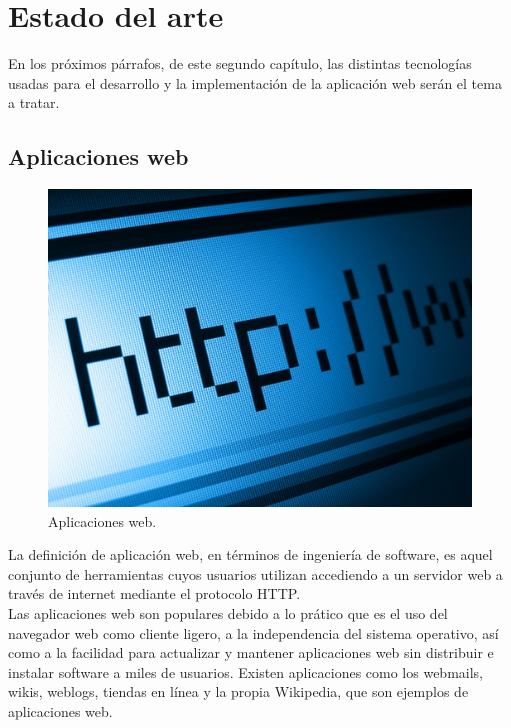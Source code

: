 \chapter{Estado del arte}\label{CAP:Estadodelarte}
En los pr\'oximos p\'arrafos, de este segundo cap\'itulo, las distintas tecnolog\'ias usadas para el desarrollo y la implementaci\'on de la aplicaci\'on web ser\'an el tema a tratar.\\
 
\section{Aplicaciones web}\label{SEC:Seccion1}

\begin{figure}[htbp]

    \centering
    	\includegraphics[scale=0.1]{./Figuras/appweb.jpg}
    \caption{Aplicaciones web.}
    \label{fig:appweb}
    
\end{figure}

La definici\'on de aplicaci\'on web, en t\'erminos de ingenier\'ia de software, es aquel conjunto de herramientas cuyos usuarios utilizan accediendo a un servidor web a trav\'es de internet mediante el protocolo HTTP.\\

Las aplicaciones web son populares debido a lo pr\'atico que es el uso del navegador web como cliente ligero, a la independencia del sistema operativo, as\'i como a la facilidad para actualizar y mantener aplicaciones web sin distribuir e instalar software a miles de usuarios. Existen aplicaciones como los webmails, wikis, weblogs, tiendas en l\'inea y la propia Wikipedia, que son ejemplos de aplicaciones web.\\

